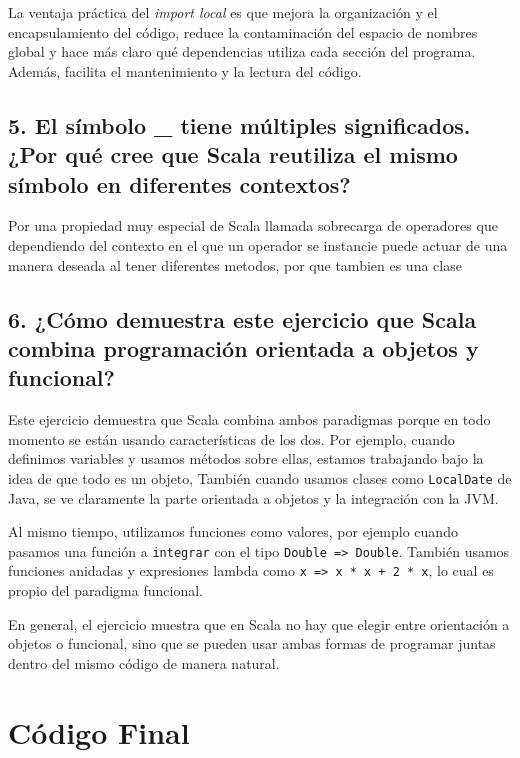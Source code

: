 \documentclass[12pt]{article}
\begin{document}
La ventaja práctica del \textit{import local} es que mejora la organización y el encapsulamiento del código, reduce la contaminación del espacio de nombres global y hace más claro qué dependencias utiliza cada sección del programa. Además, facilita el mantenimiento y la lectura del código.
\vspace{1cm}

\subsection*{5. El símbolo \_ tiene múltiples significados. ¿Por qué cree que Scala reutiliza el mismo símbolo en diferentes contextos?}
Por una propiedad muy especial de Scala llamada sobrecarga de operadores que dependiendo del contexto en el que un operador se instancie puede actuar de una manera deseada al tener diferentes metodos, por que tambien es una clase 
\vspace{1cm}

\subsection*{6. ¿Cómo demuestra este ejercicio que Scala combina programación orientada a objetos y funcional?}
Este ejercicio demuestra que Scala combina ambos paradigmas porque en todo momento se están usando características de los dos. Por ejemplo, cuando definimos variables y usamos métodos sobre ellas, estamos trabajando bajo la idea de que todo es un objeto, También cuando usamos clases como \texttt{LocalDate} de Java, se ve claramente la parte orientada a objetos y la integración con la JVM.

Al mismo tiempo, utilizamos funciones como valores, por ejemplo cuando pasamos una función a \texttt{integrar} con el tipo \texttt{Double => Double}. También usamos funciones anidadas y expresiones lambda como \texttt{x => x * x + 2 * x}, lo cual es propio del paradigma funcional.

En general, el ejercicio muestra que en Scala no hay que elegir entre orientación a objetos o funcional, sino que se pueden usar ambas formas de programar juntas dentro del mismo código de manera natural.
\vspace{1cm}

\newpage

\section*{Código Final}
\end{document}
